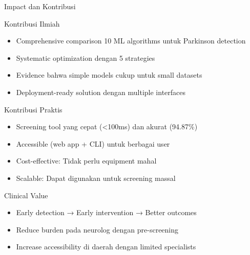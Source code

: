 \documentclass[aspectratio=169]{beamer}
\begin{document}
\begin{frame}{Impact dan Kontribusi}
\begin{block}{Kontribusi Ilmiah}
\begin{itemize}
    \item Comprehensive comparison 10 ML algorithms untuk Parkinson detection
    \item Systematic optimization dengan 5 strategies
    \item Evidence bahwa simple models cukup untuk small datasets
    \item Deployment-ready solution dengan multiple interfaces
\end{itemize}
\end{block}

\begin{block}{Kontribusi Praktis}
\begin{itemize}
    \item Screening tool yang cepat (<100ms) dan akurat (94.87\%)
    \item Accessible (web app + CLI) untuk berbagai user
    \item Cost-effective: Tidak perlu equipment mahal
    \item Scalable: Dapat digunakan untuk screening massal
\end{itemize}
\end{block}

\begin{block}{Clinical Value}
\begin{itemize}
    \item Early detection → Early intervention → Better outcomes
    \item Reduce burden pada neurolog dengan pre-screening
    \item Increase accessibility di daerah dengan limited specialists
\end{itemize}
\end{block}
\end{frame}
\end{document}
